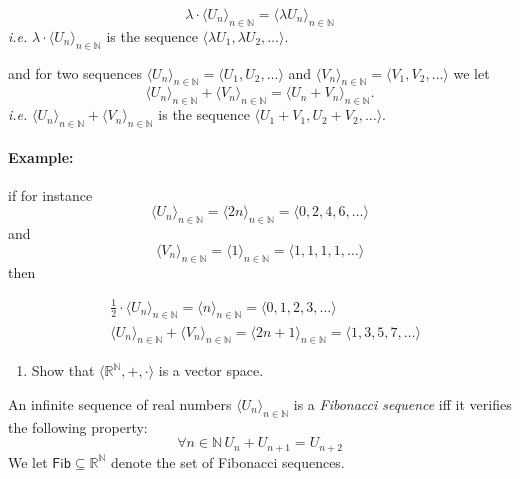 \documentclass{article}
\begin{document}
\[ \lambda \cdot \langle U_n \rangle_{n \in \mathbb{N}} = \langle \lambda U_n \rangle_{n \in \mathbb{N}} \] \emph{i.e.} $\lambda \cdot \langle U_n \rangle_{n \in \mathbb{N}}$ is the sequence $\langle \lambda U_1, \lambda U_2, \dots \rangle$.

and for two sequences $\langle U_n \rangle_{n \in \mathbb{N}} = \langle U_1, U_2, \dots \rangle$ and $\langle V_n \rangle_{n \in \mathbb{N}} = \langle V_1, V_2, \dots \rangle$ we let \[\langle U_n \rangle_{n \in \mathbb{N}} + \langle V_n \rangle_{n \in \mathbb{N}} = \langle U_n + V_n \rangle_{n \in \mathbb{N}}.\] \emph{i.e.} $\langle U_n \rangle_{n \in \mathbb{N}} + \langle V_n \rangle_{n \in \mathbb{N}}$ is the sequence $\langle U_1 + V_1, U_2 + V_2, \dots \rangle$.

\paragraph{Example:} if for instance \[ \langle U_n \rangle_{n \in \mathbb{N}} = \langle 2n \rangle_{n \in \mathbb{N}} =  \langle 0, 2, 4, 6, \dots \rangle \]
and \[ \langle V_n \rangle_{n \in \mathbb{N}} = \langle 1 \rangle_{n \in \mathbb{N}} =  \langle 1, 1, 1, 1, \dots \rangle \] then

\[\begin{aligned}
&\frac{1}{2} \cdot \langle U_n \rangle_{n \in \mathbb{N}} = \langle n \rangle_{n \in \mathbb{N}} = \langle 0, 1, 2, 3, \dots \rangle\\
&\langle U_n \rangle_{n \in \mathbb{N}} + \langle V_n \rangle_{n \in \mathbb{N}} = \langle 2n + 1 \rangle_{n \in \mathbb{N}} = \langle 1, 3, 5, 7, \dots \rangle
\end{aligned}\]

\begin{enumerate}
\item Show that $\langle \mathbb{R}^{\mathbb{N}}, {+}, {\cdot}  \rangle$ is a vector space.
\end{enumerate}

An infinite sequence of real numbers $\langle U_n \rangle_{n \in \mathbb{N}}$ is a \emph{Fibonacci sequence} iff it verifies the following property:
\[ \forall n \in \mathbb{N}\, U_{n} + U_{n+1} = U_{n+2} \]
We let $\textsf{Fib} \subseteq \mathbb{R}^{\mathbb{N}}$ denote the set of Fibonacci sequences.
\end{document}
